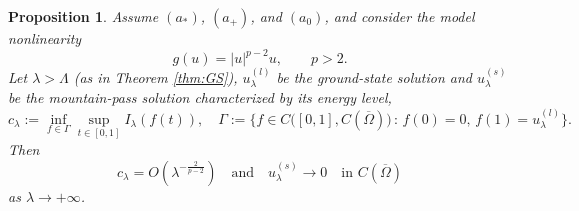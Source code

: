 \documentclass[11pt,reqno]{amsart}
\theoremstyle{plain}
\newtheorem{proposition}[theorem]{Proposition}
\theoremstyle{definition}
\numberwithin{equation}{section}
\begin{document}
\begin{proposition}
\label{prop:MP-asymptotics}
Assume $(a_\ast)$, $(a_+)$, and $(a_0)$, and consider the model
nonlinearity
$$
g(u)=|u|^{p-2}u,\qquad p>2.
$$
Let $\lambda > \Lambda$ (as in Theorem \ref{thm:GS}),  $u_\lambda^{(l)}$ be the ground-state solution and $u_\lambda^{(s)}$ be the mountain-pass solution characterized by its energy level,
$$c_\lambda:= \inf_{f\in \Gamma} \sup_{t \in [0,1]} I_\lambda(f(t)), \quad \Gamma := \{ f \in C\big ([0,1], C(\overline{\Omega}) \big ) \, : \, f(0) =0, \, f(1) = u_\lambda^{(l)} \}.$$
Then
\begin{equation} \label{eq:clambdau0}c_\lambda=O\left(\lambda^{-\frac{2}{p-2}}\right)
\quad\text{and}\quad
u_\lambda^{(s)}\rightarrow0
\quad\text{in }C(\overline{\Omega})
\end{equation}
as $\lambda\to+\infty$.
\end{proposition}
\end{document}
